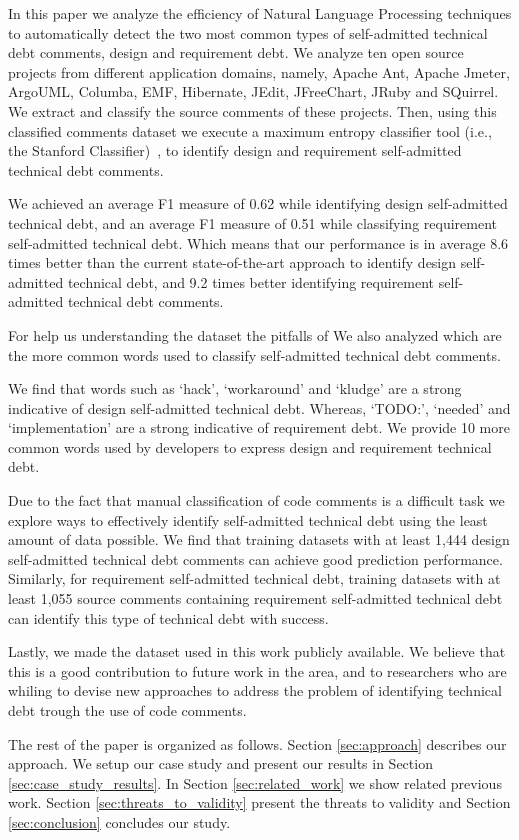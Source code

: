 \documentclass{sig-alternate}
\newcommand{\SATD}{self-admitted technical debt\xspace}
\begin{document}
In this paper we analyze the efficiency of Natural Language Processing techniques to automatically detect the two most common types of \SATD comments, design and requirement debt. We analyze ten open source projects from different application domains, namely, Apache Ant, Apache Jmeter, ArgoUML, Columba, EMF, Hibernate, JEdit, JFreeChart, JRuby and SQuirrel. We extract and classify the source comments of these projects. Then, using this classified comments dataset we execute a maximum entropy classifier tool (i.e., the Stanford Classifier)~\cite{Manning2014ACL}, to identify design and requirement \SATD comments.

We achieved an average F1 measure of 0.62 while identifying design \SATD, and an average F1 measure of 0.51 while classifying requirement \SATD. Which means that our performance is in average 8.6 times better than the current state-of-the-art approach to identify design \SATD, and 9.2 times better identifying requirement \SATD comments.

For help us understanding the dataset the pitfalls of We also analyzed which are the more common words used to classify \SATD comments. 


We find that words such as `hack', `workaround' and `kludge' are a strong indicative of design \SATD. Whereas, `TODO:', `needed' and `implementation' are a strong indicative of requirement debt. We provide 10 more common words used by developers to express design and requirement technical debt.  

Due to the fact that manual classification of code comments is a difficult task we explore ways to effectively identify \SATD using the least amount of data possible. We find that training datasets with at least 1,444 design \SATD comments can achieve good prediction performance. Similarly, for requirement \SATD, training datasets with at least 1,055 source comments containing requirement \SATD can identify this type of technical debt with success.  

Lastly, we made the dataset used in this work publicly available. We believe that this is a good contribution to future work in the area, and to researchers who are whiling to devise new approaches to address the problem of identifying technical debt trough the use of code comments.

The rest of the paper is organized as follows. Section \ref{sec:approach} describes our approach. We setup our case study and present our
results in Section \ref{sec:case_study_results}. In Section \ref{sec:related_work} we show related previous work. Section \ref{sec:threats_to_validity} present the threats to validity and Section \ref{sec:conclusion} concludes our study.  
\end{document}
